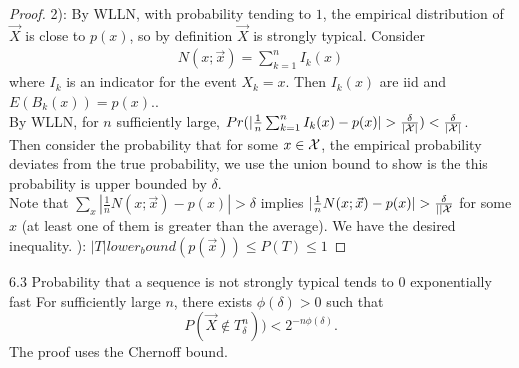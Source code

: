 \documentclass[../main.tex]{subfiles}
\begin{document}
\begin{proof}
    2): By WLLN, with probability tending to $1$, the empirical distribution of $\vec X$ is close to $p(x)$, so by definition $\vec X$ is strongly typical. Consider \begin{align*}
        N(x;\vec x)=\sum_{k=1}^{n}I_k(x)
    \end{align*} where $I_k$ is an indicator for the event $X_k=x$. Then $I_k(x)$ are iid and $E(B_k(x))=p(x). $.\\
    By WLLN, for $n$ sufficiently large, $Pr(|\frac{1}{n}\sum_{k=1}^{n}I_k(x)-p(x)|>\frac{\delta}{|\X|}) < \frac{\delta}{|\X|}$.\\
    Then consider the probability that for some $x\in \mathcal{X}$, the empirical probability deviates from the true probability, we use the union bound to show is the this probability is upper bounded by $\delta$.\\
    Note that $\sum_x|\frac{1}{n}N(x;\vec x)-p(x)|>\delta$ implies $|\frac{1}{n}N(x;\vec x)-p(x)|>\frac{\delta}{||\X}$ for some $x$ (at least one of them is greater than the average). We have the desired inequality.
    ): $ |T| lower_bound(p(\vec x))\leq P(T) \leq 1$
\end{proof}
\begin{bbox}{6.3 Probability that a sequence is not strongly typical tends to $0$ exponentially fast}
    For sufficiently large $n$, there exists $\phi(\delta)>0$ such that \[
    P(\vec X\notin T^{n}_\delta)) < 2^{-n\phi(\delta)}.
    \]
The proof uses the Chernoff bound.
\end{bbox}
\end{document}
